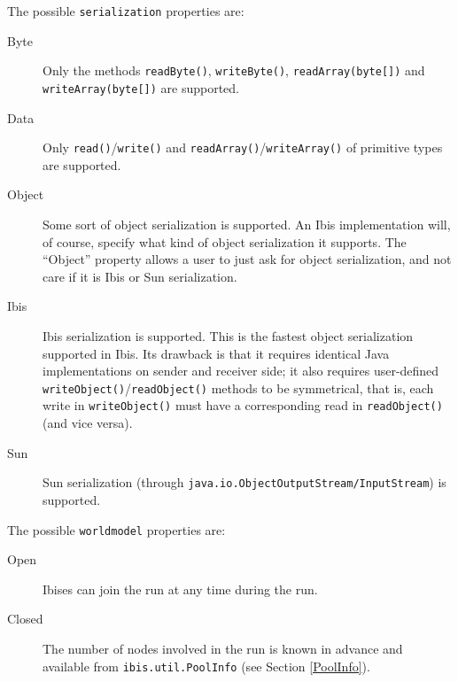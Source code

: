 \documentclass[10pt]{article}
\begin{document}
The possible \texttt{serialization} properties are:
\begin{description}
\item[Byte]
Only the methods \texttt{readByte()}, \texttt{writeByte()}, \texttt{readArray(byte[])} and \texttt{writeArray(byte[])} are supported.
\item[Data]
Only \texttt{read()}/\texttt{write()} and \texttt{readArray()}/\texttt{writeArray()} of primitive types are supported.
\item[Object]
Some sort of object serialization is supported. An Ibis implementation
will, of course, specify what kind of object serialization it supports.
The ``Object'' property allows a user to just ask for object
serialization, and not care if it is Ibis or Sun serialization.
\item[Ibis]
Ibis serialization is supported.
This is the fastest object serialization supported in Ibis. Its drawback
is that it requires identical Java implementations on sender and
receiver side; 
it also requires user-defined
\texttt{writeObject()}/\texttt{readObject()} methods to be symmetrical, that is,
each write in \texttt{writeObject()} must have a corresponding read
in \texttt{readObject()} (and vice versa).
\item[Sun]
Sun serialization (through \texttt{java.io.ObjectOutputStream/InputStream}) is
supported.
\end{description}

\noindent
The possible \texttt{worldmodel} properties are:
\begin{description}
\item[Open]
Ibises can join the run at any time during the run.
\item[Closed]
The number of nodes involved in the run is known in advance and
available from \texttt{ibis.util.PoolInfo} (see Section \ref{PoolInfo}).
\end{description}
\end{document}
